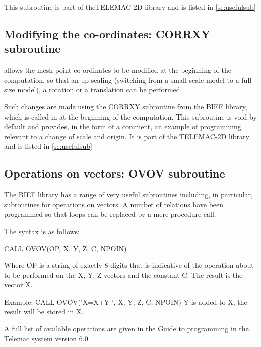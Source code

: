  This subroutine is part of theTELEMAC-2D library and is listed in \ref{se:usefulsub}


\subsection{ Modifying the co-ordinates: CORRXY subroutine }

 \tomawac allows the mesh point co-ordinates to be modified at the beginning of the computation, so that an up-scaling (switching from a small scale model to a full-size model), a rotation or a translation can be performed.

 Such changes are made using the CORRXY subroutine from the BIEF library, which is called in at the beginning of the computation. This subroutine is void by default and provides, in the form of a comment, an example of programming relevant to a change of scale and origin. It is part of the TELEMAC-2D library and is listed in \ref{se:usefulsub}

\subsection{ Operations on vectors: OVOV subroutine }

 The BIEF library has a range of very useful subroutines including, in particular, subroutines for operations on vectors. A number of relations have been programmed so that loops can be replaced by a mere procedure call.

 The syntax is as follows:

 CALL OVOV(OP, X, Y, Z, C, NPOIN)

 Where OP is a string of exactly 8 digits that is indicative of the operation about to be performed on the X, Y, Z vectors and the constant C. The result is the vector X.

 Example:  CALL OVOV('X=X+Y ', X, Y, Z, C, NPOIN)  Y is added to X, the result will be stored in X.

 A full list of available operations are given in the Guide to programming in the Telemac system version 6.0.
